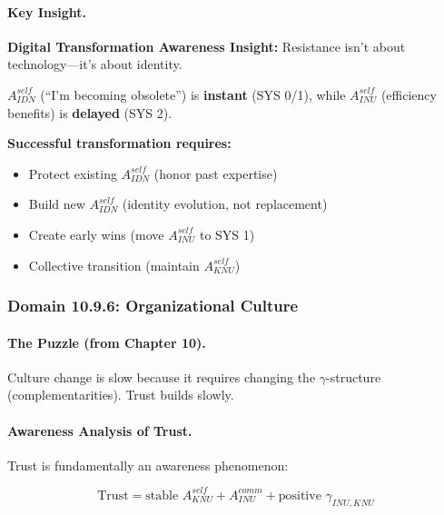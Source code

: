 \paragraph{Key Insight.}
\begin{tcolorbox}[colback=yellow!10!white, colframe=yellow!50!black]
\textbf{Digital Transformation Awareness Insight:}
Resistance isn't about technology---it's about identity.

$A^{self}_{IDN}$ (``I'm becoming obsolete'') is \textbf{instant} (SYS 0/1),
while $A^{self}_{INU}$ (efficiency benefits) is \textbf{delayed} (SYS 2).

\textbf{Successful transformation requires:}
\begin{itemize}
\item Protect existing $A^{self}_{IDN}$ (honor past expertise)
\item Build new $A^{self}_{IDN}$ (identity evolution, not replacement)
\item Create early wins (move $A^{self}_{INU}$ to SYS 1)
\item Collective transition (maintain $A^{self}_{KNU}$)
\end{itemize}
\end{tcolorbox}

\subsubsection{Domain 10.9.6: Organizational Culture}
\label{subsubsec:awareness-culture}

\paragraph{The Puzzle (from Chapter 10).}
Culture change is slow because it requires changing the $\gamma$-structure
(complementarities). Trust builds slowly.

\paragraph{Awareness Analysis of Trust.}
Trust is fundamentally an awareness phenomenon:

\begin{equation}
\text{Trust} = \text{stable } A^{self}_{KNU} + A^{comm}_{INU} + \text{positive } \gamma_{INU,KNU}
\end{equation}

